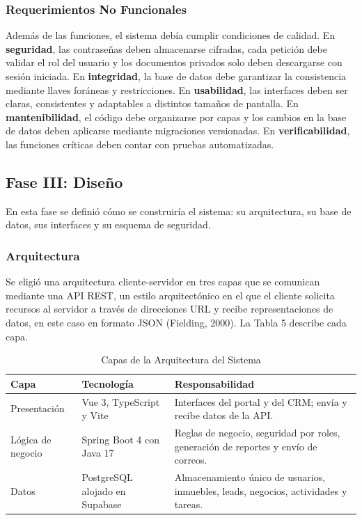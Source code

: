 \documentclass[stu,12pt,letterpaper,donotrepeattitle,floatsintext]{apa7}
\begin{document}
\subsubsection{Requerimientos No Funcionales}

Además de las funciones, el sistema debía cumplir condiciones de calidad. En \textbf{seguridad}, las contraseñas deben almacenarse cifradas, cada petición debe validar el rol del usuario y los documentos privados solo deben descargarse con sesión iniciada. En \textbf{integridad}, la base de datos debe garantizar la consistencia mediante llaves foráneas y restricciones. En \textbf{usabilidad}, las interfaces deben ser claras, consistentes y adaptables a distintos tamaños de pantalla. En \textbf{mantenibilidad}, el código debe organizarse por capas y los cambios en la base de datos deben aplicarse mediante migraciones versionadas. En \textbf{verificabilidad}, las funciones críticas deben contar con pruebas automatizadas.

\subsection{Fase III: Diseño}

En esta fase se definió cómo se construiría el sistema: su arquitectura, su base de datos, sus interfaces y su esquema de seguridad.

\subsubsection{Arquitectura}

Se eligió una arquitectura cliente-servidor en tres capas que se comunican mediante una API REST, un estilo arquitectónico en el que el cliente solicita recursos al servidor a través de direcciones URL y recibe representaciones de datos, en este caso en formato JSON (Fielding, 2000). La Tabla 5 describe cada capa.

\begin{table}[htbp]
\caption{Capas de la Arquitectura del Sistema}
\small
\begin{tabularx}{\linewidth}{>{\hsize}L>{\hsize}L>{\hsize}L}
\toprule
\textbf{Capa} & \textbf{Tecnología} & \textbf{Responsabilidad} \\
\midrule
Presentación & Vue 3, TypeScript y Vite & Interfaces del portal y del CRM; envía y recibe datos de la API. \\
Lógica de negocio & Spring Boot 4 con Java 17 & Reglas de negocio, seguridad por roles, generación de reportes y envío de correos. \\
Datos & PostgreSQL alojado en Supabase & Almacenamiento único de usuarios, inmuebles, leads, negocios, actividades y tareas. \\
\bottomrule
\end{tabularx}
\end{table}
\end{document}
